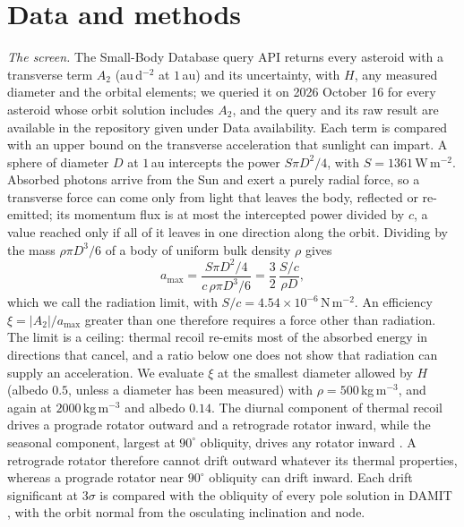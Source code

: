 \documentclass[3p,11pt]{elsarticle}
\begin{document}
\section{Data and methods}\label{sec:method}

\emph{The screen.} The Small-Body Database query API returns every asteroid with a
transverse term $A_2$ (au\,d$^{-2}$ at $1$\,au) and its uncertainty, with $H$, any
measured diameter and the orbital elements; we queried it on 2026 October 16 for every
asteroid whose orbit solution includes $A_2$, and the query and its raw result are
available in the repository given under Data availability. Each term is compared with an
upper bound on the transverse acceleration that sunlight can impart. A sphere of
diameter $D$ at $1$\,au intercepts the power $S\pi D^2/4$, with $S=1361$\,W\,m$^{-2}$.
Absorbed photons arrive from the Sun and exert a purely radial force, so a transverse force
can come only from light that leaves the body, reflected or re-emitted; its momentum flux
is at most the intercepted power divided by $c$, a value reached only if all of it leaves
in one direction along the orbit. Dividing by the mass $\rho\pi D^3/6$ of a body of
uniform bulk density $\rho$ gives
\begin{equation}
a_{\max}=\frac{S\pi D^2/4}{c\,\rho\pi D^3/6}=\frac{3}{2}\,\frac{S/c}{\rho D},
\label{eq:amax}
\end{equation}
which we call the radiation limit, with $S/c=4.54\times10^{-6}$\,N\,m$^{-2}$. An
efficiency $\xi=|A_2|/a_{\max}$ greater than one therefore requires a force other than
radiation. The limit is a ceiling: thermal recoil re-emits most of the absorbed energy in
directions that cancel, and a ratio below one does not show that radiation can supply an
acceleration. We evaluate $\xi$ at the smallest diameter allowed by $H$ (albedo $0.5$,
unless a diameter has been measured) with $\rho=500$\,kg\,m$^{-3}$, and again at
$2000$\,kg\,m$^{-3}$ and albedo $0.14$. The diurnal component of thermal recoil drives a
prograde rotator outward and a retrograde rotator inward, while the seasonal component,
largest at $90^\circ$ obliquity, drives any rotator inward \citep{Vokrouhlicky2015}. A
retrograde rotator therefore cannot drift outward whatever its thermal properties, whereas
a prograde rotator near $90^\circ$ obliquity can drift inward. Each drift significant at
$3\sigma$ is compared with the obliquity of every pole solution in
DAMIT \citep{Durech2010}, with the orbit normal from the osculating inclination and node.
\end{document}
